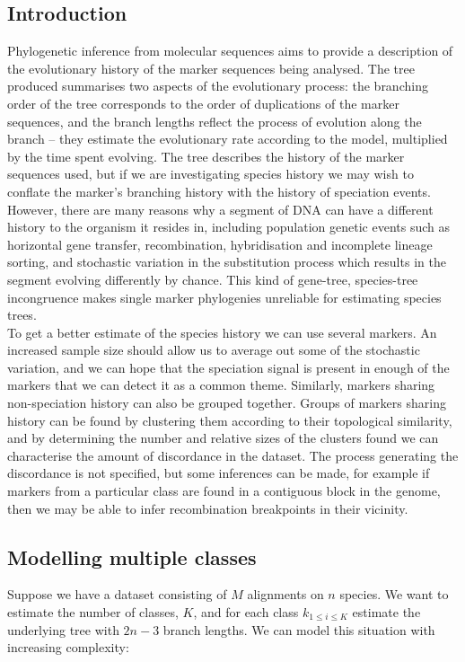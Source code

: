 \documentclass[11pt]{article}
\begin{document}
\subsection{Introduction}
Phylogenetic inference from molecular sequences aims to provide a description of the evolutionary history of the marker sequences being analysed. The tree produced summarises two aspects of the evolutionary process: the branching order of the tree corresponds to the order of duplications of the marker sequences, and the branch lengths reflect the process of evolution along the branch -- they estimate the evolutionary rate according to the model, multiplied by the time spent evolving. The tree describes the history of the marker sequences used, but if we are investigating species history we may wish to conflate the marker's branching history with the history of speciation events. However, there are many reasons why a segment of DNA can have a different history to the organism it resides in, including population genetic events such as horizontal gene transfer, recombination, hybridisation and incomplete lineage sorting, and stochastic variation in the substitution process which results in the segment evolving differently by chance. This kind of gene-tree, species-tree incongruence makes single marker phylogenies unreliable for estimating species trees.\\
To get a better estimate of the species history we can use several markers. An increased sample size should allow us to average out some of the stochastic variation, and we can hope that the speciation signal is present in enough of the markers that we can detect it as a common theme. Similarly, markers sharing non-speciation history can also be grouped together. Groups of markers sharing history can be found by clustering them according to their topological similarity, and by determining the number and relative sizes of the clusters found we can characterise the amount of discordance in the dataset. The process generating the discordance is not specified, but some inferences can be made, for example if markers from a particular class are found in a contiguous block in the genome, then we may be able to infer recombination breakpoints in their vicinity.

\subsection{Modelling multiple classes}
Suppose we have a dataset consisting of $M$ alignments on $n$ species. We want to estimate the number of classes, $K$, and for each class $k_{1 \leq i \leq K}$ estimate the underlying tree with $2n-3$ branch lengths. We can model this situation with increasing complexity:
\end{document}
